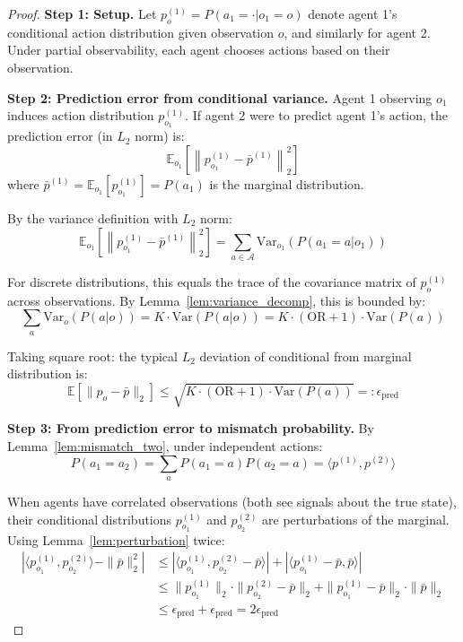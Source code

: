 \begin{proof}
\textbf{Step 1: Setup.}
Let $p^{(1)}_o = P(a_1 = \cdot | o_1 = o)$ denote agent 1's conditional action distribution given observation $o$, and similarly for agent 2. Under partial observability, each agent chooses actions based on their observation.

\textbf{Step 2: Prediction error from conditional variance.}
Agent 1 observing $o_1$ induces action distribution $p^{(1)}_{o_1}$. If agent 2 were to predict agent 1's action, the prediction error (in $L_2$ norm) is:
\begin{equation}
\mathbb{E}_{o_1}\left[\left\| p^{(1)}_{o_1} - \bar{p}^{(1)} \right\|_2^2\right]
\end{equation}
where $\bar{p}^{(1)} = \mathbb{E}_{o_1}[p^{(1)}_{o_1}] = P(a_1)$ is the marginal distribution.

By the variance definition with $L_2$ norm:
\begin{equation}
\mathbb{E}_{o_1}\left[\left\| p^{(1)}_{o_1} - \bar{p}^{(1)} \right\|_2^2\right] = \sum_{a \in \mathcal{A}} \text{Var}_{o_1}(P(a_1 = a | o_1))
\end{equation}

For discrete distributions, this equals the trace of the covariance matrix of $p^{(1)}_o$ across observations. By Lemma~\ref{lem:variance_decomp}, this is bounded by:
\begin{equation}
\sum_a \text{Var}_{o}(P(a|o)) = K \cdot \text{Var}(P(a|o)) = K \cdot (\text{OR} + 1) \cdot \text{Var}(P(a))
\end{equation}

Taking square root: the typical $L_2$ deviation of conditional from marginal distribution is:
\begin{equation}
\mathbb{E}[\|p_o - \bar{p}\|_2] \leq \sqrt{K \cdot (\text{OR} + 1) \cdot \text{Var}(P(a))} =: \epsilon_{\text{pred}}
\end{equation}

\textbf{Step 3: From prediction error to mismatch probability.}
By Lemma~\ref{lem:mismatch_two}, under independent actions:
\begin{equation}
P(a_1 = a_2) = \sum_a P(a_1 = a) P(a_2 = a) = \langle p^{(1)}, p^{(2)} \rangle
\end{equation}

When agents have correlated observations (both see signals about the true state), their conditional distributions $p^{(1)}_{o_1}$ and $p^{(2)}_{o_2}$ are perturbations of the marginal. Using Lemma~\ref{lem:perturbation} twice:
\begin{align}
\left| \langle p^{(1)}_{o_1}, p^{(2)}_{o_2} \rangle - \|\bar{p}\|_2^2 \right| &\leq \left| \langle p^{(1)}_{o_1}, p^{(2)}_{o_2} - \bar{p} \rangle \right| + \left| \langle p^{(1)}_{o_1} - \bar{p}, \bar{p} \rangle \right| \\
&\leq \|p^{(1)}_{o_1}\|_2 \cdot \|p^{(2)}_{o_2} - \bar{p}\|_2 + \|p^{(1)}_{o_1} - \bar{p}\|_2 \cdot \|\bar{p}\|_2 \\
&\leq \epsilon_{\text{pred}} + \epsilon_{\text{pred}} = 2\epsilon_{\text{pred}}
\end{align}


\end{proof}
